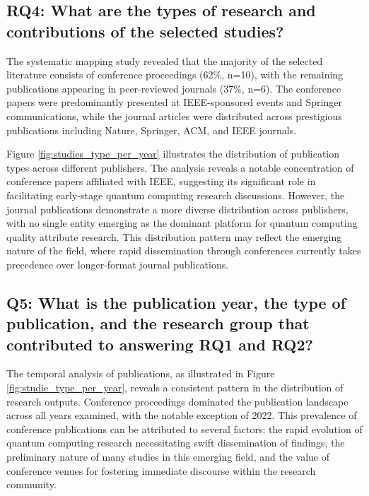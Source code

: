 \subsection{RQ4: What are the types of research and contributions of the selected studies? }

The systematic mapping study revealed that the majority of the selected literature consists of conference proceedings (62\%, n=10), with the remaining publications appearing in peer-reviewed journals (37\%, n=6). The conference papers were predominantly presented at IEEE-sponsored events and Springer communications, while the journal articles were distributed across prestigious publications including Nature, Springer, ACM, and IEEE journals.

Figure \ref{fig:studies_type_per_year} illustrates the distribution of publication types across different publishers. The analysis reveals a notable concentration of conference papers affiliated with IEEE, suggesting its significant role in facilitating early-stage quantum computing research discussions. However, the journal publications demonstrate a more diverse distribution across publishers, with no single entity emerging as the dominant platform for quantum computing quality attribute research. This distribution pattern may reflect the emerging nature of the field, where rapid dissemination through conferences currently takes precedence over longer-format journal publications.

\subsection{Q5: What is the publication year, the type of publication, and the research group that contributed to answering RQ1 and RQ2? }

The temporal analysis of publications, as illustrated in Figure \ref{fig:studie_type_per_year}, reveals a consistent pattern in the distribution of research outputs. Conference proceedings dominated the publication landscape across all years examined, with the notable exception of 2022. This prevalence of conference publications can be attributed to several factors: the rapid evolution of quantum computing research necessitating swift dissemination of findings, the preliminary nature of many studies in this emerging field, and the value of conference venues for fostering immediate discourse within the research community.
